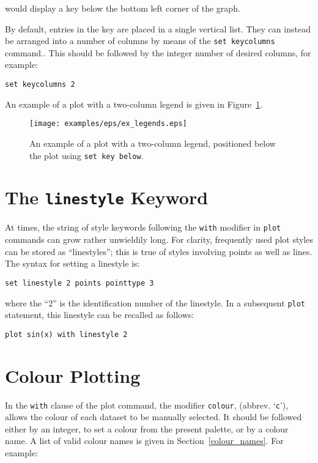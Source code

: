 \noindent would display a key below the bottom left corner of the graph.

By default, entries in the key are placed in a single vertical list. They can
instead be arranged into a number of columns by means of the \texttt{set
keycolumns} command.. This should be followed by the integer number of desired columns, for
example:

\begin{verbatim}
set keycolumns 2
\end{verbatim}

An example of a plot with a two-column legend is given in Figure~\ref{fig:ex_legends}.

\begin{figure}
\begin{center}
\texttt{[image: examples/eps/ex\_legends.eps]}
\end{center}
\caption{An example of a plot with a two-column legend, positioned below the plot using {\tt set key below}.}
\label{fig:ex_legends}
\end{figure}

\section{The \texttt{linestyle} Keyword}

At times, the string of style keywords following the \texttt{with} modifier in
\texttt{plot} commands can grow rather unwieldily long. For clarity, frequently
used plot styles can be stored as ``linestyles''; this is true of styles
involving points as well as lines. The syntax for setting a linestyle is:

\begin{verbatim}
set linestyle 2 points pointtype 3
\end{verbatim}

\noindent where the ``2'' is the identification number of the linestyle. In a
subsequent \texttt{plot} statement, this linestyle can be recalled as follows:

\begin{verbatim}
plot sin(x) with linestyle 2
\end{verbatim}

\section{Colour Plotting}

 In the \texttt{with}
clause of the plot command, the modifier \texttt{colour}, (abbrev.
`\texttt{c}'), allows the colour of each dataset to be manually selected. It
should be followed either by an integer, to set a colour from the present
palette, or by a colour name. A list of valid colour names is given in
Section~\ref{colour_names}. For example:

